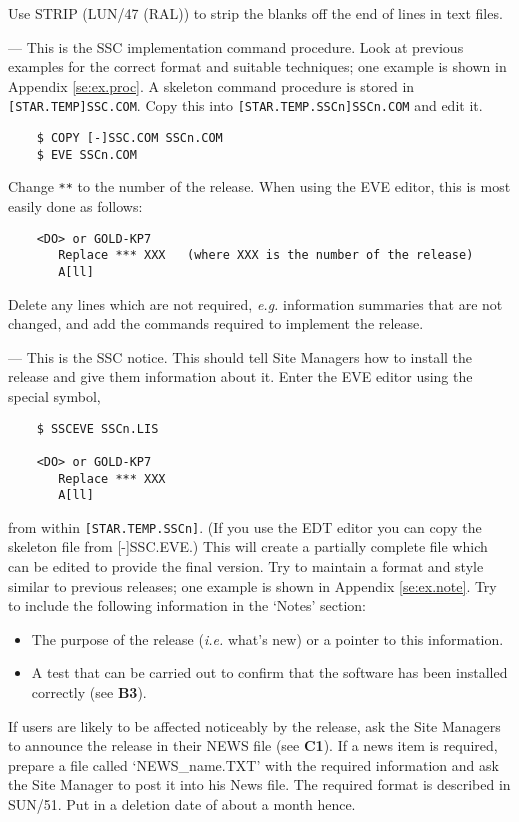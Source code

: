 \begin{description}
Use STRIP (LUN/47 (RAL)) to strip the blanks off the end of lines in text files.

\item [A7 : PREPARE SSCn.COM] ---
This is the SSC implementation command procedure.
Look at previous examples for the correct format and suitable techniques; one
example is shown in Appendix \ref{se:ex.proc}.
A skeleton command procedure is stored in {\tt [STAR.TEMP]SSC.COM}.
Copy this into {\tt [STAR.TEMP.SSCn]\-SSCn.\-COM} and edit it.
\begin{verbatim}
    $ COPY [-]SSC.COM SSCn.COM
    $ EVE SSCn.COM
\end{verbatim}
Change {\tt ***} to the number of the release.
When using the EVE editor, this is most easily done as follows:
\begin{verbatim}
    <DO> or GOLD-KP7
       Replace *** XXX   (where XXX is the number of the release)
       A[ll]
\end{verbatim}
Delete any lines which are not required, {\em e.g.} information summaries that
are not changed, and add the commands required to implement the release.

\item [A8 : PREPARE SSCn.LIS] ---
This is the SSC notice.
This should tell Site Managers how to install the release and give them
information about it.
Enter the EVE editor using the special symbol,
\begin{verbatim}
    $ SSCEVE SSCn.LIS

    <DO> or GOLD-KP7
       Replace *** XXX
       A[ll]
\end{verbatim}
from within {\tt [STAR.TEMP.SSCn]}.
(If you use the EDT editor you can copy the skeleton file from [-]SSC.EVE.)
This will create a partially complete file which can be edited to provide the
final version.
Try to maintain a format and style similar to previous releases; one example is
shown in Appendix \ref{se:ex.note}.
Try to include the following information in the `Notes' section:
\begin{itemize}
\item The purpose of the release ({\em i.e.} what's new) or a pointer to this
information.
\item A test that can be carried out to confirm that the software has been
installed correctly (see {\bf B3}).
\end{itemize}
If users are likely to be affected noticeably by the release, ask the Site
Managers to announce the release in their NEWS file (see {\bf C1}).
If a news item is required, prepare a file called `NEWS\_name.TXT' with the
required information and ask the Site Manager to post it into his News file.
The required format is described in SUN/51.
Put in a deletion date of about a month hence.


\end{description}
